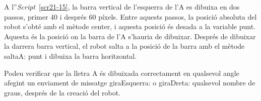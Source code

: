 
A  l''\emph{Script}~\ref{scr21-15}, la barra vertical de l'esquerra de l'A es dibuixa en dos passos, primer 40 i després 60 píxels. Entre aquests passos, la posició absoluta del robot s'obté amb el mètode \textsf{center}, i aquesta posició és desada a la variable \textsf{punt}. Aquesta és la posició on la barra de l'A s'hauria de dibuixar. Després de dibuixar la darrera barra vertical, el robot salta a la posició de la barra amb el mètode \textsf{saltaA: punt} i dibuixa la barra horitzontal.

Podeu verificar que la lletra A és dibuixada correctament en qualsevol angle afegint un enviament de missatge \textsf{giraEsquerra:} o \textsf{giraDreta:} qualsevol nombre de graus, després de la creació del robot.

